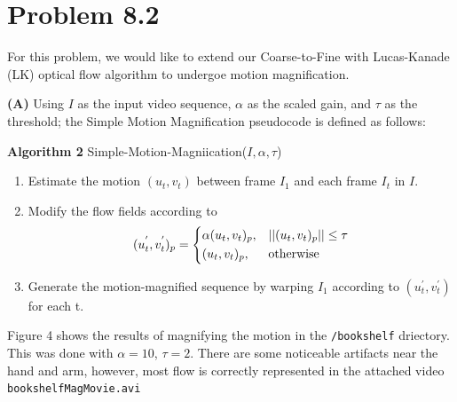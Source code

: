 \documentclass[12pt,twoside]{article}
\newcommand{\tabUnit}{3ex}
\newcommand{\tabT}{\hspace*{\tabUnit}}
\begin{document}
\section*{Problem 8.2}
\tabT For this problem, we would like to extend our Coarse-to-Fine with Lucas-Kanade (LK) optical flow algorithm to undergoe motion magnification.
\newline

\textbf{(A)} Using $I$ as the input video sequence, $\alpha$ as the scaled gain, and $\tau$ as the threshold; the Simple Motion Magnification pseudocode is defined as follows:\newline\newline

\textbf{Algorithm 2} Simple-Motion-Magniication($I, \alpha, \tau$)
\begin{enumerate}
  \item Estimate the motion $(u_{t}, v_{t})$ between frame $I_{1}$ and each frame $I_{t}$ in $I$.
  \item Modify the flow fields according to
  \[
    {(u_{t}^{'}, v_{t}^{'})_{p}}=
    \begin{dcases}
      {\alpha (u_{t},v_{t})_{p}}, & ||(u_{t},v_{t})_{p}|| \leq \tau \\
      (u_{t},v_{t})_{p}, & \text{otherwise}
    \end{dcases}
  \]
  \item Generate the motion-magnified sequence by warping $I_{1}$ according to $(u_{t}^{'},v_{t}^{'})$ for each t.
 \end{enumerate}

 Figure 4 shows the results of magnifying the motion in the \texttt{/bookshelf} driectory.  This was done with $\alpha = 10$, $\tau = 2$.  There are some noticeable artifacts near the hand and arm, however, most flow is correctly represented in the attached video \texttt{bookshelfMagMovie.avi} \newline
\end{document}
